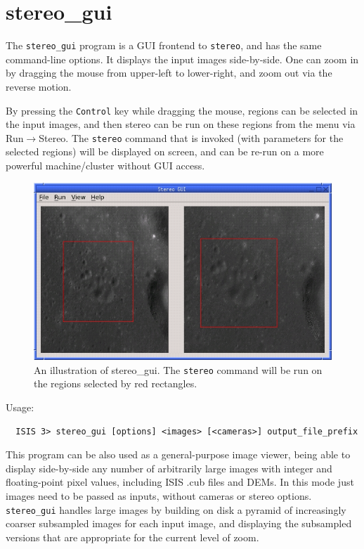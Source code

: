 \section{stereo\_gui}
\label{stereo_gui}

The \texttt{stereo\_gui} program is a GUI frontend to \texttt{stereo},
and has the same command-line options. It displays
the input images side-by-side. One can zoom in by dragging the
mouse from upper-left to lower-right, and zoom out via the reverse
motion.

By pressing the \texttt{Control} key while dragging the mouse, regions
can be selected in the input images, and then stereo can be run on these
regions from the menu via Run$\rightarrow$Stereo. The \texttt{stereo}
command that is invoked (with parameters for the selected regions) will
be displayed on screen, and can be re-run on a more powerful
machine/cluster without GUI access.

\begin{figure}[h!]
\begin{center}
\includegraphics[width=5in]{images/stereo_gui.jpg}
\caption[asp\_gui]{An illustration of stereo\_gui. The \texttt{stereo} command
will be run on the regions selected by red rectangles.}
\label{asp_gui_fig}
\end{center}
\end{figure}

Usage:
\begin{verbatim}
  ISIS 3> stereo_gui [options] <images> [<cameras>] output_file_prefix
\end{verbatim}

This program can be also used as a general-purpose image viewer, being
able to display side-by-side any number of arbitrarily large images with
integer and floating-point pixel values, including ISIS .cub files and
DEMs. In this mode just images need to be passed as inputs, without
cameras or stereo options. \texttt{stereo\_gui} handles large images by
building on disk a pyramid of increasingly coarser subsampled images for
each input image, and displaying the subsampled versions that are
appropriate for the current level of zoom.

